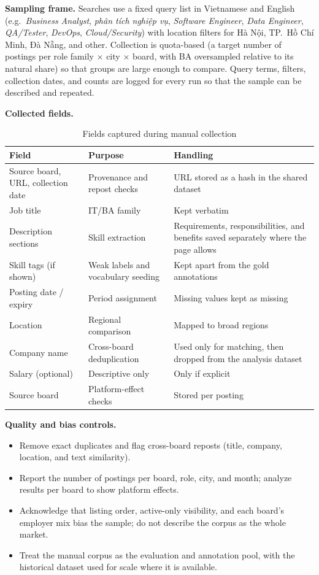 \documentclass[12pt,a4paper]{article}
\begin{document}
\textbf{Sampling frame.} Searches use a fixed query list in Vietnamese
and English (e.g.\ \emph{Business Analyst}, \emph{phân tích nghiệp vụ},
\emph{Software Engineer}, \emph{Data Engineer}, \emph{QA/Tester},
\emph{DevOps}, \emph{Cloud/Security}) with location filters for Hà Nội,
TP.~Hồ Chí Minh, Đà Nẵng, and other. Collection is quota-based (a target
number of postings per role family $\times$ city $\times$ board, with BA
oversampled relative to its natural share) so that groups are large enough
to compare. Query terms, filters, collection dates, and counts are logged
for every run so that the sample can be described and repeated.

\textbf{Collected fields.}

\begin{table}[H]
\centering\small
\caption{Fields captured during manual collection}
\label{tab:crawlfields}
\begin{tabularx}{\textwidth}{@{}P{3.6cm}P{4.4cm}L@{}}
\toprule
\textbf{Field} & \textbf{Purpose} & \textbf{Handling} \\
\midrule
Source board, URL, collection date & Provenance and repost checks & URL
  stored as a hash in the shared dataset \\
Job title & IT/BA family & Kept verbatim \\
Description sections & Skill extraction & Requirements, responsibilities,
  and benefits saved separately where the page allows \\
Skill tags (if shown) & Weak labels and vocabulary seeding & Kept apart from
  the gold annotations \\
Posting date / expiry & Period assignment & Missing values kept as missing \\
Location & Regional comparison & Mapped to broad regions \\
Company name & Cross-board deduplication & Used only for matching, then
  dropped from the analysis dataset \\
Salary (optional) & Descriptive only & Only if explicit \\
Source board & Platform-effect checks & Stored per posting \\
\bottomrule
\end{tabularx}
\end{table}

\textbf{Quality and bias controls.}
\begin{itemize}
  \item Remove exact duplicates and flag cross-board reposts (title,
        company, location, and text similarity).
  \item Report the number of postings per board, role, city, and month;
        analyze results per board to show platform effects.
  \item Acknowledge that listing order, active-only visibility, and each
        board's employer mix bias the sample; do not describe the corpus
        as the whole market.
  \item Treat the manual corpus as the evaluation and annotation pool,
        with the historical dataset used for scale where it is available.
\end{itemize}
\end{document}
